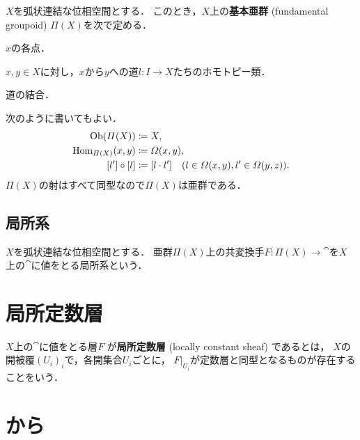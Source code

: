 \(X\)を弧状連結な位相空間とする．
このとき，\(X\)上の\textbf{基本亜群} (fundamental groupoid) 
\(\varPi(X)\)を次で定める．
\begin{description}\setlength{\leftskip}{2zw}
    \item[対象] \(x\)の各点．
    \item[射] \(x, y\in X\)に対し，\(x\)から\(y\)への道\(l\colon I\to X\)たちのホモトピー類．
    \item[合成] 道の結合．
\end{description}
次のように書いてもよい．
\begin{align*}
    \mathop{\mathrm{Ob}}\nolimits(\varPi(X))&\coloneqq X,\\
    \mathop{\mathrm{Hom}}\nolimits_{\varPi(X)}(x,y)&\coloneqq \varOmega(x,y),\\
    [l']\circ [l]&\coloneqq [l\cdot l'] \quad (l\in \varOmega(x,y), l'\in \varOmega(y,z)). 
\end{align*}
\(\varPi(X)\)の射はすべて同型なので\(\varPi(X)\)は亜群である．

\subsection{局所系}
\(X\)を弧状連結な位相空間とする．
亜群\(\varPi(X)\)上の共変換手\(
    F\colon \varPi(X)\to \cat
\)を\(X\)上の\(\cat\)に値をとる局所系という．

\section{局所定数層}

\(X\)上の\(\cat\)に値をとる層\(F\)
が\textbf{局所定数層} (locally constant sheaf) であるとは，
\(X\)の開被覆\((U_i)_i\)で，各開集合\(U_i\)ごとに，
\(F\rvert_{U_i}\)が定数層と同型となるものが存在することをいう．





















\section{{\cite{Sp66}}から}





